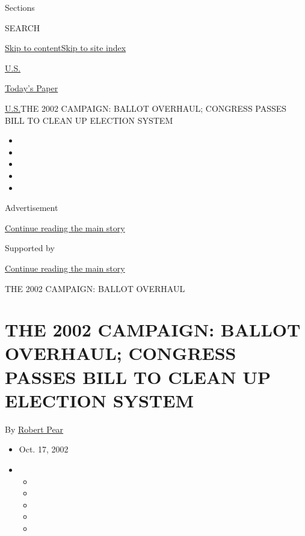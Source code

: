 Sections

SEARCH

\protect\hyperlink{site-content}{Skip to
content}\protect\hyperlink{site-index}{Skip to site index}

\href{https://www.nytimes.com/section/us}{U.S.}

\href{https://myaccount.nytimes.com/auth/login?response_type=cookie\&client_id=vi}{}

\href{https://www.nytimes.com/section/todayspaper}{Today's Paper}

\href{/section/us}{U.S.}\textbar{}THE 2002 CAMPAIGN: BALLOT OVERHAUL;
CONGRESS PASSES BILL TO CLEAN UP ELECTION SYSTEM

\begin{itemize}
\item
\item
\item
\item
\item
\end{itemize}

Advertisement

\protect\hyperlink{after-top}{Continue reading the main story}

Supported by

\protect\hyperlink{after-sponsor}{Continue reading the main story}

THE 2002 CAMPAIGN: BALLOT OVERHAUL

\hypertarget{the-2002-campaign-ballot-overhaul-congress-passes-bill-to-clean-up-election-system}{%
\section{THE 2002 CAMPAIGN: BALLOT OVERHAUL; CONGRESS PASSES BILL TO
CLEAN UP ELECTION
SYSTEM}\label{the-2002-campaign-ballot-overhaul-congress-passes-bill-to-clean-up-election-system}}

By \href{https://www.nytimes.com/by/robert-pear}{Robert Pear}

\begin{itemize}
\item
  Oct. 17, 2002
\item
  \begin{itemize}
  \item
  \item
  \item
  \item
  \item
  \end{itemize}
\end{itemize}

